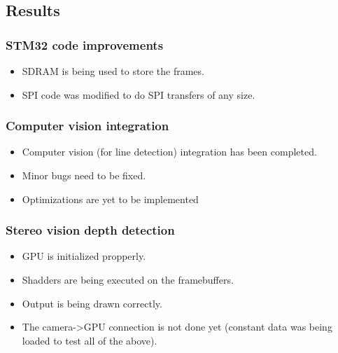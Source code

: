 \subsection{Results}

\subsubsection{STM32 code improvements}
\begin{itemize}
	\item SDRAM is being used to store the frames.
	\item SPI code was modified to do SPI transfers of any size.
\end{itemize}


\subsubsection{Computer vision integration}
\begin{itemize}
	\item Computer vision (for line detection) integration has been completed.
	\item Minor bugs need to be fixed.
	\item Optimizations are yet to be implemented
\end{itemize}


\subsubsection{Stereo vision depth detection}
\begin{itemize}
	\item GPU is initialized propperly.
	\item Shadders are being executed on the framebuffers.
	\item Output is being drawn correctly.
	\item The camera->GPU connection is not done yet (constant data was being loaded to test all of the above).
\end{itemize}
